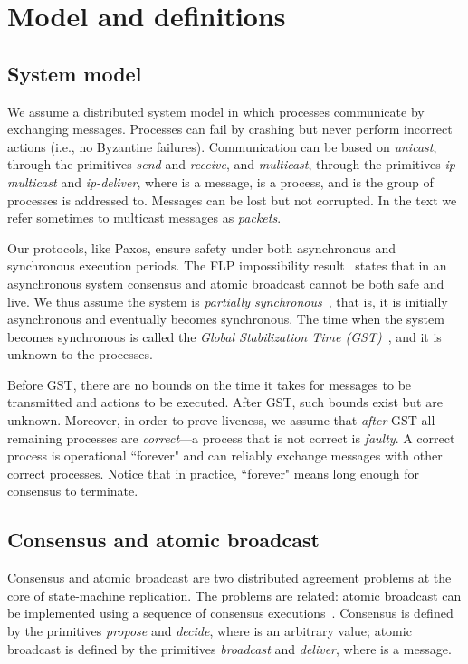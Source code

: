 \documentclass[final,3p,times,twocolumn,authoryear]{elsarticle}
\begin{document}
\section{Model and definitions}
\label{sec:moddef}

\subsection{System model}
\label{sec:model}

We assume a distributed system model in which processes communicate by exchanging messages. Processes can fail by crashing but never perform incorrect actions (i.e., no Byzantine failures).
Communication can be based on \emph{unicast}, through the primitives \emph{send} and \emph{receive}, and \emph{multicast}, through the primitives \emph{ip-multicast} and \emph{ip-deliver}, where  is a message,  is a process, and  is the group of processes  is addressed to. Messages can be lost but not corrupted. In the text we refer sometimes to multicast messages as \emph{packets}.

Our protocols, like Paxos, ensure safety under both asynchronous and synchronous execution periods. The FLP impossibility result~\cite{FLP85} states that in an asynchronous system consensus and atomic broadcast cannot be both safe and live. We thus assume the system is \emph{partially synchronous}~\cite{DLS88}, that is, it is initially asynchronous and eventually becomes synchronous. The time when the system becomes synchronous is called the \emph{Global Stabilization Time (GST)}~\cite{DLS88}, and it is unknown to the processes.

Before GST, there are no bounds on the time it takes for messages to be transmitted and actions to be executed. After GST, such bounds exist but are unknown. Moreover, in order to prove liveness, we assume that \emph{after} GST all remaining processes are \emph{correct}---a process that is not correct is \emph{faulty}. A correct process is operational ``forever" and can reliably exchange messages with other correct processes. Notice that in practice, ``forever" means long enough for consensus to terminate.


\subsection{Consensus and atomic broadcast}

Consensus and atomic broadcast are two distributed agreement problems at the core of state-machine replication. The problems are related: atomic broadcast can be implemented using a sequence of consensus executions~\cite{CT96}. Consensus is defined by the primitives \emph{propose} and \emph{decide}, where  is an arbitrary value; atomic broadcast is defined by the primitives \emph{broadcast} and \emph{deliver}, where  is a message.
\end{document}
